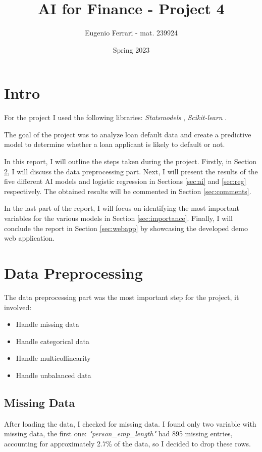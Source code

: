 \documentclass{article}
\title{AI for Finance - Project 4}
\author{Eugenio Ferrari - mat. 239924}
\date{Spring 2023}
\begin{document}
\maketitle

\section{Intro}\label{sec:intro}

For the project I used the following libraries: \emph{Statsmodels} \cite{statsmodels}, \emph{Scikit-learn} \cite{scikit}. 

\vspace{1.5em}\noindent 
The goal of the project was to analyze loan default data and create a predictive model to determine whether a loan applicant is likely to default or not.

In this report, I will outline the steps taken during the project. Firstly, in Section \ref{sec:data-preprocessing}, I will discuss the data preprocessing part. Next, I will present the results of the five different AI models and logistic regression in Sections \ref{sec:ai} and \ref{sec:reg} respectively. The obtained results will be commented in Section \ref{sec:comments}.

In the last part of the report, I will focus on identifying the most important variables for the various models in Section \ref{sec:importance}. Finally, I will conclude the report in Section \ref{sec:webapp} by showcasing the developed demo web application.  

\section{Data Preprocessing}\label{sec:data-preprocessing}
The data preprocessing part was the most important step for the project, it involved:
\begin{itemize}    
    \item Handle missing data
    \item Handle categorical data
    \item Handle multicollinearity
    \item Handle unbalanced data    
\end{itemize}

\subsection{Missing Data}\label{subsec:missing-data}
After loading the data, I checked for missing data. I found only two variable with missing data, the first one: \emph{"person\_emp\_length"} had 895 missing entries, accounting for approximately 2.7\% of the data, so I decided to drop these rows. 
\end{document}
